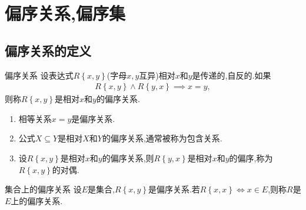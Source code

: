 \chapter{偏序关系,偏序集}

\section{偏序关系的定义}

\begin{definition}{偏序关系}{}
	设表达式$R\left\{x,y\right\}$(字母$x,y$互异)相对$x$和$y$是传递的,自反的.如果
	\begin{align*}
		R\left\{x,y\right\}\wedge R\left\{y,x\right\}\implies x=y,
	\end{align*}
	则称$R\left\{x,y\right\}$是相对$x$和$y$的偏序关系.
\end{definition}

\begin{example}{}{}
	\begin{enumerate}
		\item 相等关系$x=y$是偏序关系.
		\item 公式$X\subseteq Y$是相对$X$和$Y$的偏序关系,通常被称为包含关系.
		\item 设$R\left\{x,y\right\}$是相对$x$和$y$的偏序关系,则$R\left\{y,x\right\}$是相对$x$和$y$的偏序,称为$R\left\{x,y\right\}$的对偶.
	\end{enumerate}
\end{example}

\begin{definition}{集合上的偏序关系}{}
	设$E$是集合,$R\left\{x,y\right\}$是偏序关系.若$R\left\{x,x\right\}\iff x\in E$,则称$R$是$E$上的偏序关系.
\end{definition}

